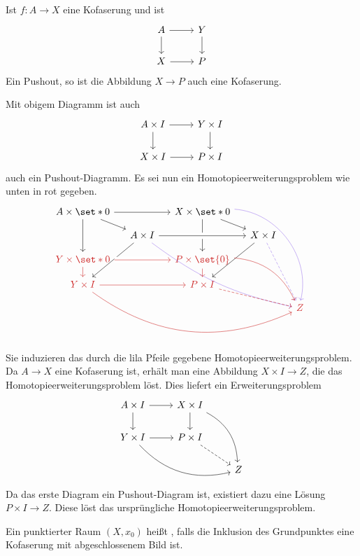 \begin{satz}
	Ist $f \colon A \to X$ eine Kofaserung und ist 
	\[
		\begin{tikzcd}
			A \rar \dar & Y\dar \\
			X \rar & P
		\end{tikzcd}
	\]
	Ein Pushout, so ist die Abbildung $X \to P$ auch eine Kofaserung.
\end{satz}
\begin{beweis}
	Mit obigem Diagramm ist auch
	\[
		\begin{tikzcd}
			A \times I \dar \rar & Y \times I \dar \\
			X \times I \rar & P \times I
		\end{tikzcd} 
	\]
	auch ein Pushout-Diagramm.
	Es sei nun ein Homotopieerweiterungsproblem wie unten in rot gegeben.
	\[
		\begin{tikzcd}[sep=small]
			A \times \set*{0} \ar[rr] \ar[dd] \drar & & X \times \set*{0} \ar[dd] \drar	\ar[ddddrr, bend left=50,MediumPurple2] \\
			& A \times I \ar[ddl] \ar[rr,crossing over] \ar[dddrrr,MediumPurple2,bend right=12] & & X \times I \ar[ddl] \ar[dddr,dashed,MediumPurple2] \\
			\color{Firebrick3} Y \times \set*{0} \dar[Firebrick3] \ar[rr,Firebrick3,crossing over] && \color{Firebrick3} P \times \set{0} \dar[Firebrick3] \ar[ddrr,bend left,Firebrick3] \\
			\color{Firebrick3}Y \times I \ar[rr,Firebrick3]  \ar[drrrr,bend right,Firebrick3] && \color{Firebrick3}P \times I \ar[drr,dashed,Firebrick3] \\
			& & & & \color{Firebrick3}Z
		\end{tikzcd}
	\]
	Sie induzieren das durch die lila Pfeile gegebene Homotopieerweiterungsproblem.
	Da $A \to X$ eine Kofaserung ist, erhält man eine Abbildung $X \times I \to Z$, die das Homotopieerweiterungsproblem löst.
	Dies liefert ein Erweiterungsproblem
	\[
		\begin{tikzcd}
			A \times I \rar\dar & X \times I \dar \ar[ddr,bend left] \\
			Y \times I \rar \ar[drr,bend right]& P \times I \drar[dashed] \\
			& & Z
		\end{tikzcd}
	\]
	Da das erste Diagram ein Pushout-Diagram ist, existiert dazu eine Lösung $P \times I \to Z$.
	Diese löst das ursprüngliche Homotopieerweiterungsproblem.
\end{beweis}

\begin{definition}[{name=[wohlpunktierter Raum]}]
	Ein punktierter Raum $(X,x_0)$ heißt , falls die Inklusion des Grundpunktes eine Kofaserung mit abgeschlossenem Bild ist.
\end{definition}

